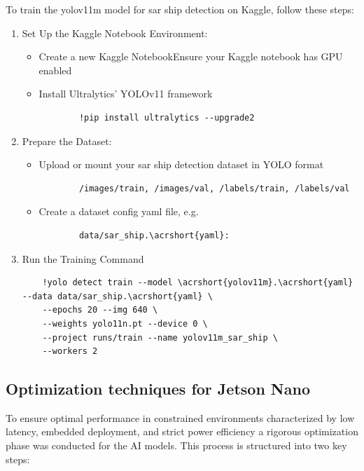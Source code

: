 \documentclass{article}
\begin{document}
To train the \acrshort{yolov11m} model for \acrshort{sar} ship detection on Kaggle, follow these steps:
\begin{enumerate}
    \item Set Up the Kaggle Notebook Environment:
    \begin{itemize}
        \item Create a new Kaggle NotebookEnsure your Kaggle notebook has GPU enabled
        \item Install Ultralytics' YOLOv11 framework
        \begin{lstlisting}
        !pip install ultralytics --upgrade2
        \end{lstlisting}
    \end{itemize}

    \item Prepare the Dataset:
    \begin{itemize}
        \item Upload or mount your \acrshort{sar} ship detection dataset in YOLO format
        \begin{lstlisting}
        /images/train, /images/val, /labels/train, /labels/val
        \end{lstlisting}
        \item Create a dataset config \acrshort{yaml} file, e.g. \begin{lstlisting}
        data/sar_ship.\acrshort{yaml}:
        \end{lstlisting}
    \end{itemize}

    \item Run the Training Command
    \begin{lstlisting}
    !yolo detect train --model \acrshort{yolov11m}.\acrshort{yaml} --data data/sar_ship.\acrshort{yaml} \
    --epochs 20 --img 640 \
    --weights yolo11n.pt --device 0 \
    --project runs/train --name yolov11m_sar_ship \
    --workers 2
    \end{lstlisting}
\end{enumerate}

\subsection{Optimization techniques for Jetson Nano}
To ensure optimal performance in constrained environments characterized by low latency, embedded deployment, and strict power efficiency a rigorous optimization phase was conducted for the AI models. This process is structured into two key steps:
\end{document}
